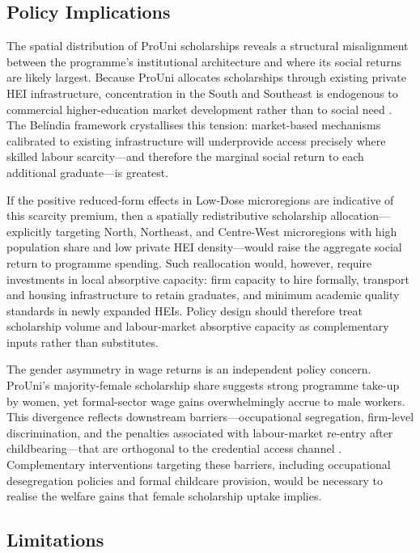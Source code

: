 \subsection*{Policy Implications}

The spatial distribution of ProUni scholarships reveals a structural misalignment between the programme's institutional architecture and where its social returns are likely largest. Because ProUni allocates scholarships through existing private HEI infrastructure, concentration in the South and Southeast is endogenous to commercial higher-education market development rather than to social need \cite{McCowan2007}. The Bel\'india framework \cite{bacha1976, Telles2004} crystallises this tension: market-based mechanisms calibrated to existing infrastructure will underprovide access precisely where skilled labour scarcity---and therefore the marginal social return to each additional graduate---is greatest.

If the positive reduced-form effects in Low-Dose microregions are indicative of this scarcity premium, then a spatially redistributive scholarship allocation---explicitly targeting North, Northeast, and Centre-West microregions with high population share and low private HEI density---would raise the aggregate social return to programme spending. Such reallocation would, however, require investments in local absorptive capacity: firm capacity to hire formally, transport and housing infrastructure to retain graduates, and minimum academic quality standards in newly expanded HEIs. Policy design should therefore treat scholarship volume and labour-market absorptive capacity as complementary inputs rather than substitutes.

The gender asymmetry in wage returns is an independent policy concern. ProUni's majority-female scholarship share suggests strong programme take-up by women, yet formal-sector wage gains overwhelmingly accrue to male workers. This divergence reflects downstream barriers---occupational segregation, firm-level discrimination, and the penalties associated with labour-market re-entry after childbearing---that are orthogonal to the credential access channel \cite{BusteloEtAl2021, Goldin2014}. Complementary interventions targeting these barriers, including occupational desegregation policies and formal childcare provision, would be necessary to realise the welfare gains that female scholarship uptake implies.

\subsection*{Limitations}

